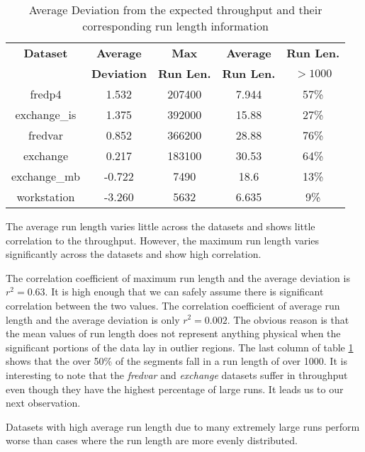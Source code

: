 \begin{table}[!t]
\renewcommand{\arraystretch}{1.3}
\caption{Average Deviation from the expected throughput and their corresponding run length information}
\label{dev}
\centering
\begin{tabular}{c||c c c c}
\hline
\bfseries Dataset 	&\bfseries Average	&\bfseries Max		&\bfseries Average	&\bfseries Run Len.	\\
 			&\bfseries Deviation 	&\bfseries Run Len.	&\bfseries Run Len.	&\bfseries $> 1000$	\\		
\hline\hline
fredp4		&1.532			&207400			&7.944			&57\%			\\
exchange\_is	&1.375			&392000			&15.88			&27\%			\\
fredvar		&0.852			&366200			&28.88			&76\%			\\
exchange 		&0.217			&183100			&30.53			&64\%			\\
exchange\_mb 	&-0.722			&7490			&18.6				&13\%			\\
workstation		&-3.260			&5632			&6.635			&9\%				\\			
\hline
\end{tabular}
\end{table}

\begin{observation}
The average run length varies little across the datasets and shows little correlation to the throughput. However, the maximum run length varies significantly across the datasets and show high correlation.
\end{observation}

The correlation coefficient of maximum run length and the average deviation is $r^2 = 0.63$. It is high enough that we can safely assume there is significant correlation between the two values. The correlation coefficient of average run length and the average deviation is only $r^2 = 0.002$. The obvious reason is that the mean values of run length does not represent anything physical when the significant portions of the data lay in outlier regions. The last column of table \ref{dev} shows that the over 50\% of the segments fall in a run length of over 1000. It is interesting to note that the \emph{fredvar} and \emph{exchange} datasets suffer in throughput even though they have the highest percentage of large runs. It leads us to our next observation.

\begin{observation}
Datasets with high average run length due to many extremely large runs perform worse than cases where the run length are more evenly distributed. 
\end{observation}

